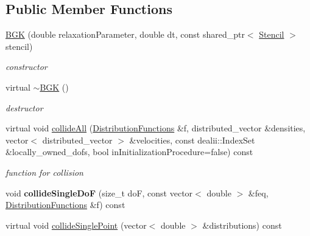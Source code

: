 \subsection*{Public Member Functions}
\begin{DoxyCompactItemize}
\item 
\hyperlink{classnatrium_1_1BGK_acb5fcbbec625b60d7f2db05e9e66fbaa}{BGK} (double relaxationParameter, double dt, const shared\_\-ptr$<$ \hyperlink{classnatrium_1_1Stencil}{Stencil} $>$ stencil)
\begin{DoxyCompactList}\small\item\em constructor \item\end{DoxyCompactList}\item 
\hypertarget{classnatrium_1_1BGK_a1029401a72788a6538e4e1941c305ab4}{
virtual \hyperlink{classnatrium_1_1BGK_a1029401a72788a6538e4e1941c305ab4}{$\sim$BGK} ()}
\label{classnatrium_1_1BGK_a1029401a72788a6538e4e1941c305ab4}

\begin{DoxyCompactList}\small\item\em destructor \item\end{DoxyCompactList}\item 
virtual void \hyperlink{classnatrium_1_1BGK_a9fa1c980217a183fc4762954e86ba36d}{collideAll} (\hyperlink{classnatrium_1_1DistributionFunctions}{DistributionFunctions} \&f, distributed\_\-vector \&densities, vector$<$ distributed\_\-vector $>$ \&velocities, const dealii::IndexSet \&locally\_\-owned\_\-dofs, bool inInitializationProcedure=false) const 
\begin{DoxyCompactList}\small\item\em function for collision \item\end{DoxyCompactList}\item 
\hypertarget{classnatrium_1_1BGK_ab82471c249d19fdc62005fb8b7e03190}{
void {\bfseries collideSingleDoF} (size\_\-t doF, const vector$<$ double $>$ \&feq, \hyperlink{classnatrium_1_1DistributionFunctions}{DistributionFunctions} \&f) const }
\label{classnatrium_1_1BGK_ab82471c249d19fdc62005fb8b7e03190}

\item 
\hypertarget{classnatrium_1_1BGK_aebf6d64d5e537c2e352451667d9003d4}{
virtual void \hyperlink{classnatrium_1_1BGK_aebf6d64d5e537c2e352451667d9003d4}{collideSinglePoint} (vector$<$ double $>$ \&distributions) const }
\label{classnatrium_1_1BGK_aebf6d64d5e537c2e352451667d9003d4}


\end{DoxyCompactItemize}
